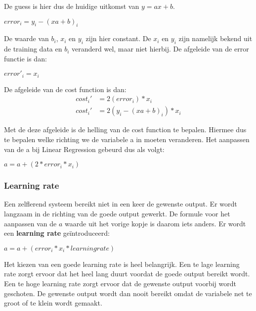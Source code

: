 De guess is hier dus de huidige uitkomst van $ y = ax + b $.

\begin{center}
$ error_{i} = y_{i} - (xa + b)_{i}$
\end{center}

De waarde van $ b_{i} $, $ x_{i} $ en $ y_{i} $ zijn hier constant. De $ x_{i} $ en $ y_{i} $ zijn namelijk bekend uit de training data en $ b_{i} $ veranderd wel, maar niet hierbij. De afgeleide van de error functie is dan:

\begin{center}
$ error'_{i} = x_i$
\end{center}

De afgeleide van de cost function is dan:
\begin{align*}
cost_i' &= 2(error_i) * x_i \\
cost_i' &= 2(y_{i} - (xa + b)_{i}) * x_i
\end{align*}

Met de deze afgeleide is de helling van de cost function te bepalen. Hiermee dus te bepalen welke richting we de variabele a in moeten veranderen. Het aanpassen van de a bij Linear Regression gebeurd dus als volgt:

\begin{center}
$ a = a + (2 * error_i * x_i)$
\end{center}

\subsubsection{Learning rate}
Een zelflerend systeem bereikt niet in een keer de gewenste output. Er wordt langzaam in de richting van de goede output gewerkt. De formule voor het aanpassen van de $a$ waarde uit het vorige kopje is daarom iets anders. Er wordt een \textbf{learning rate} ge\"{i}ntroduceerd:

\begin{center}
$ a = a + (error_i * x_i * learning rate)$
\end{center}

Het kiezen van een goede learning rate is heel belangrijk. Een te lage learning rate zorgt ervoor dat het heel lang duurt voordat de goede output bereikt wordt. Een te hoge learning rate zorgt ervoor dat de gewenste output voorbij wordt geschoten. De gewenste output wordt dan nooit bereikt omdat de variabele net te groot of te klein wordt gemaakt. \cite{GradientDescent1}\cite{GradientDescent2}

